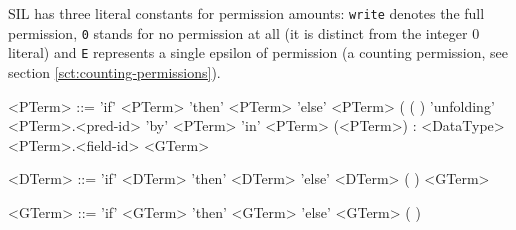 SIL has three literal constants for permission amounts: \lstinline[language=SIL]!write! denotes the full permission, \lstinline[language=SIL]!0! stands for no permission at all (it is distinct from the integer $0$ literal) and \lstinline[language=SIL]!E! represents a single epsilon of permission (a counting permission, see section \ref{sct:counting-permissions}).

\begin{grammar}
<PTerm> ::= 'if' <PTerm> 'then' <PTerm> 'else' <PTerm>
	\alt <var-id>
	\alt <func-id>(  
	\alt <dom-func-id>(  )
	\alt 'unfolding' <PTerm>.<pred-id> 'by' <PTerm> 'in' <PTerm>
	\alt (<PTerm>) : <DataType>
	\alt <PTerm>.<field-id>
	\alt <GTerm>
\end{grammar}

\begin{grammar}
<DTerm> ::= 'if' <DTerm> 'then' <DTerm> 'else' <DTerm>
	\alt <logical-var-id>
	\alt <dom-func-id>(  )
	\alt <GTerm>
\end{grammar}

\begin{grammar}
<GTerm> ::= 'if' <GTerm> 'then' <GTerm> 'else' <GTerm>
	\alt {}
	\alt  <dom-func-id>(  )
\end{grammar}